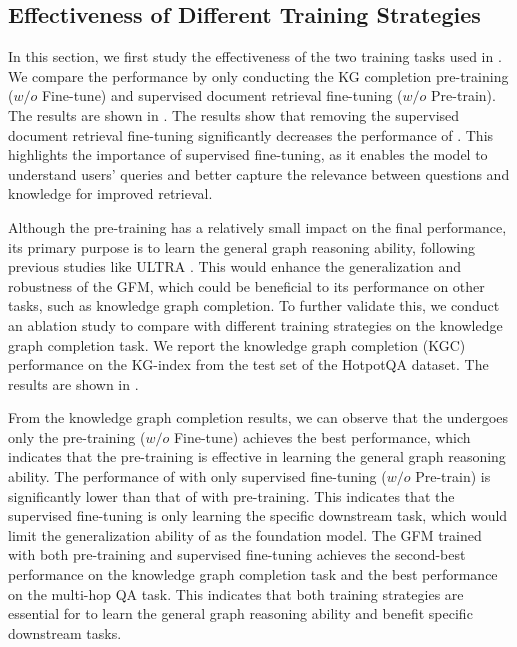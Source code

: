 \subsection{Effectiveness of Different Training Strategies}\label{app:pre-training}
In this section, we first study the effectiveness of the two training tasks used in \ourmethod. We compare the performance by only conducting the KG completion pre-training (\ourmethod $w/o$ Fine-tune) and supervised document retrieval fine-tuning (\ourmethod $w/o$ Pre-train). The results are shown in . The results show that removing the supervised document retrieval fine-tuning significantly decreases the performance of \ourmethod. This highlights the importance of supervised fine-tuning, as it enables the model to understand users' queries and better capture the relevance between questions and knowledge for improved retrieval. 



Although the pre-training has a relatively small impact on the final performance, its primary purpose is to learn the general graph reasoning ability, following previous studies like ULTRA \cite{galkintowards}. This would enhance the generalization and robustness of the GFM, which could be beneficial to its performance on other tasks, such as knowledge graph completion. To further validate this, we conduct an ablation study to compare \ourmethod with different training strategies on the knowledge graph completion task. We report the knowledge graph completion (KGC) performance on the KG-index from the test set of the HotpotQA dataset. The results are shown in . 

From the knowledge graph completion results, we can observe that the \ourmethod undergoes only the pre-training (\ourmethod $w/o$ Fine-tune) achieves the best performance, which indicates that the pre-training is effective in learning the general graph reasoning ability. The performance of \ourmethod with only supervised fine-tuning (\ourmethod $w/o$ Pre-train) is significantly lower than that of \ourmethod with pre-training. This indicates that the supervised fine-tuning is only learning the specific downstream task, which would limit the generalization ability of \ourmethod as the foundation model. The GFM trained with both pre-training and supervised fine-tuning achieves the second-best performance on the knowledge graph completion task and the best performance on the multi-hop QA task. This indicates that both training strategies are essential for \ourmethod to learn the general graph reasoning ability and benefit specific downstream tasks.


